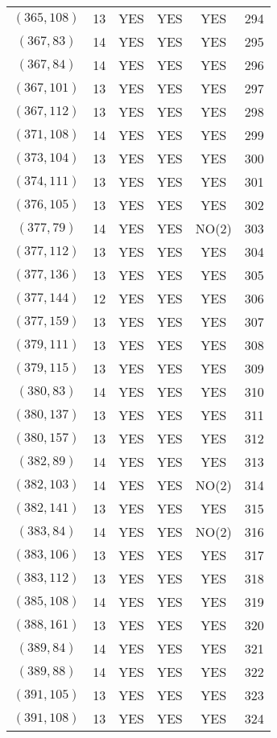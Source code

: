 \begin{longtable}{|c|c|c|c|c|c|}
$(365, 108)$ & 13 & YES & YES & YES & 294\\
$(367, 83)$ & 14 & YES & YES & YES & 295\\
$(367, 84)$ & 14 & YES & YES & YES & 296\\
$(367, 101)$ & 13 & YES & YES & YES & 297\\
$(367, 112)$ & 13 & YES & YES & YES & 298\\
$(371, 108)$ & 14 & YES & YES & YES & 299\\
$(373, 104)$ & 13 & YES & YES & YES & 300\\
$(374, 111)$ & 13 & YES & YES & YES & 301\\
$(376, 105)$ & 13 & YES & YES & YES & 302\\
$(377, 79)$ & 14 & YES & YES & NO(2) & 303\\
$(377, 112)$ & 13 & YES & YES & YES & 304\\
$(377, 136)$ & 13 & YES & YES & YES & 305\\
$(377, 144)$ & 12 & YES & YES & YES & 306\\
$(377, 159)$ & 13 & YES & YES & YES & 307\\
$(379, 111)$ & 13 & YES & YES & YES & 308\\
$(379, 115)$ & 13 & YES & YES & YES & 309\\
$(380, 83)$ & 14 & YES & YES & YES & 310\\
$(380, 137)$ & 13 & YES & YES & YES & 311\\
$(380, 157)$ & 13 & YES & YES & YES & 312\\
$(382, 89)$ & 14 & YES & YES & YES & 313\\
$(382, 103)$ & 14 & YES & YES & NO(2) & 314\\
$(382, 141)$ & 13 & YES & YES & YES & 315\\
$(383, 84)$ & 14 & YES & YES & NO(2) & 316\\
$(383, 106)$ & 13 & YES & YES & YES & 317\\
$(383, 112)$ & 13 & YES & YES & YES & 318\\
$(385, 108)$ & 14 & YES & YES & YES & 319\\
$(388, 161)$ & 13 & YES & YES & YES & 320\\
$(389, 84)$ & 14 & YES & YES & YES & 321\\
$(389, 88)$ & 14 & YES & YES & YES & 322\\
$(391, 105)$ & 13 & YES & YES & YES & 323\\
$(391, 108)$ & 13 & YES & YES & YES & 324\\

\end{longtable}
